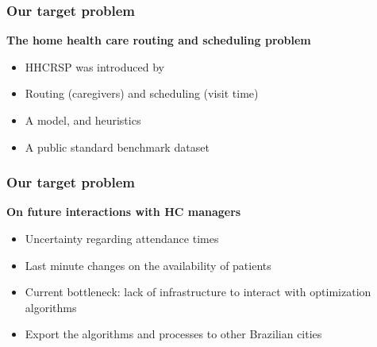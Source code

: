 \begin{frame}
   \frametitle{Our target problem}

   \textbf{The home health care routing and scheduling problem}
   \begin{itemize}
      \item HHCRSP was introduced by \citet{mankowska2014}
      \item Routing (caregivers) and scheduling (visit time)
      \item A model, and heuristics
      \item A public standard benchmark dataset
   \end{itemize}



\end{frame}

\begin{frame}
   \frametitle{Our target problem}

   \textbf{On future interactions with HC managers}
   \begin{itemize}
      \item Uncertainty regarding attendance times
      \item Last minute changes on the availability of patients
      \item Current bottleneck: lack of infrastructure to interact with optimization algorithms
      \item Export the algorithms and processes to other Brazilian cities
   \end{itemize}
\end{frame}



